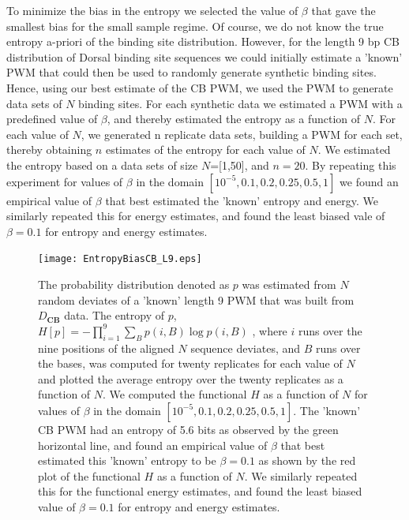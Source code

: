 To minimize the bias in the entropy we selected the value of $\beta$ that gave the smallest bias for the small sample regime.  Of course, we do not know the true entropy a-priori of the binding site distribution.  However, for the length 9 bp CB distribution of Dorsal binding site sequences we could initially estimate a 'known' PWM that could then be used to randomly generate synthetic binding sites.  Hence, using our best estimate of the CB PWM, we used the PWM to generate data sets of $N$ binding sites.  For each synthetic data we estimated a PWM with a predefined value of $\beta$, and thereby estimated the entropy as a function of $N$.  For each value of $N$, we generated n replicate data sets, building a PWM for each set, thereby obtaining $n$ estimates of the entropy for each value of $N$.  We estimated the entropy based on a data sets of size $N$=[1,50], and $n=20$.  By repeating this experiment for values of $\beta$ in the domain $[10^{-5},0.1,0.2,0.25,0.5, 1]$ we found an empirical value of $\beta$ that best estimated the 'known' entropy and energy.  We similarly repeated this for energy estimates, and found the least biased vale of $\beta=0.1$ for entropy and energy estimates.
\begin{figure}[!htbp]
\texttt{[image: EntropyBiasCB\_L9.eps]}
\caption{ The probability distribution denoted as $p$ was estimated from $N$ random deviates of a 'known' length 9 PWM that was built from $D_\textbf{CB}$ data.  The entropy of $p$, $H[p]=-\prod_{i=1}^9 \sum_B p(i,B) \log p(i,B)$ , where $i$ runs over the nine positions of the aligned $N$ sequence deviates, and $B$ runs over the bases, was computed for twenty replicates for each value of $N$ and plotted the average entropy over the twenty replicates as a function of $N$.  We computed the functional $H$ as a function of $N$ for values of $\beta$ in the domain $[10^{-5},0.1,0.2,0.25,0.5, 1]$.  The 'known' CB PWM had an entropy of 5.6 bits as observed by the green horizontal line, and found an empirical value of $\beta$ that best estimated this 'known' entropy to be $\beta=0.1$ as shown by the red plot of the functional $H$ as a function of $N$.  We similarly repeated this for the functional energy estimates, and found the least biased value of $\beta=0.1$ for entropy and energy estimates.}\label{entropybias}
\end{figure}



